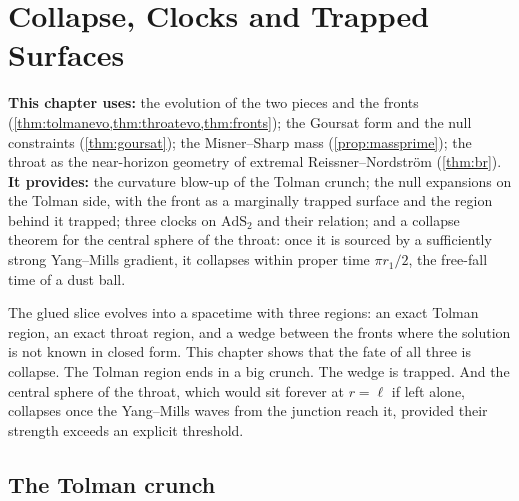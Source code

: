 \chapter{Collapse, Clocks and Trapped Surfaces}
\label{ch:collapse}

\begin{usesbox}
\textbf{This chapter uses:} the evolution of the two pieces and the fronts (\cref{thm:tolmanevo,thm:throatevo,thm:fronts}); the Goursat form and the null constraints (\cref{thm:goursat}); the Misner--Sharp mass (\cref{prop:massprime}); the throat as the near-horizon geometry of extremal Reissner--Nordstr\"om (\cref{thm:br}).\\
\textbf{It provides:} the curvature blow-up of the Tolman crunch; the null expansions on the Tolman side, with the front as a marginally trapped surface and the region behind it trapped; three clocks on $\mathrm{AdS}_2$ and their relation; and a collapse theorem for the central sphere of the throat: once it is sourced by a sufficiently strong Yang--Mills gradient, it collapses within proper time $\pi r_1/2$, the free-fall time of a dust ball.
\end{usesbox}

The glued slice evolves into a spacetime with three regions: an exact Tolman region, an exact throat region, and a wedge between the fronts where the solution is not known in closed form. This chapter shows that the fate of all three is collapse. The Tolman region ends in a big crunch. The wedge is trapped. And the central sphere of the throat, which would sit forever at $r=\ell$ if left alone, collapses once the Yang--Mills waves from the junction reach it, provided their strength exceeds an explicit threshold.

\section{The Tolman crunch}

